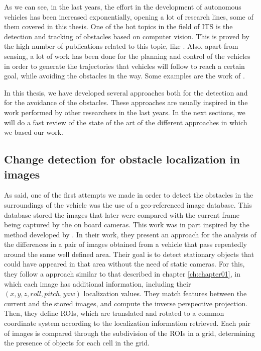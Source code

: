 As we can see, in the last years, the effort in the development of autonomous vehicles has been increased exponentially, opening a lot of research lines, some of them covered in this thesis. One of the hot topics in the field of \ac{ITS} is the detection and tracking of obstacles based on computer vision. This is proved by the high number of publications related to this topic, like \cite{Broggi2006, Broggi2010, primdahl2005change, Scharstein2002, Morales2011, Geiger2012, Steingrube2009, Morales2012, Morales2009, badino2009stixel, gunyel2012stixels, danescu2012particle, broggi2013}.
Also, apart from sensing, a lot of work has been done for the planning and control of the vehicles in order to generate the trajectories that vehicles will follow to reach a certain goal, while avoiding the obstacles in the way. Some examples are the work of \cite{werling2010optimal, thrun2006stanley, chu2012local}.

In this thesis, we have developed several approaches both for the detection and for the avoidance of the obstacles. These approaches are usually inspired in the work performed by other researchers in the last years. In the next sections, we will do a fast review of the state of the art of the different approaches in which we based our work. 

\subsection{Change detection for obstacle localization in images}\label{ch:chapter00_02_01}

As said, one of the first attempts we made in order to detect the obstacles in the surroundings of the vehicle was the use of a geo-referenced image database. This database stored the images that later were compared with the current frame being captured by the on board cameras. This work was in part inspired by the method developed by \cite{primdahl2005change}. In their work, they present an approach for the analysis of the differences in a pair of images obtained from a vehicle that pass repeatedly around the same well defined area. Their goal is to detect stationary objects that could have appeared in that area without the need of static cameras. For this, they follow a approach similar to that described in chapter \ref{ch:chapter01}, in which each image has additional information, including their $(x, y, z, roll, pitch, yaw)$ localization values. They match features between the current and the stored images, and compute the inverse perspective projection. Then, they define \acp{ROI}, which are translated and rotated to a common coordinate system according to the localization information retrieved. Each pair of images is compared through the subdivision of the \acp{ROI} in a grid, determining the presence of objects for each cell in the grid.

